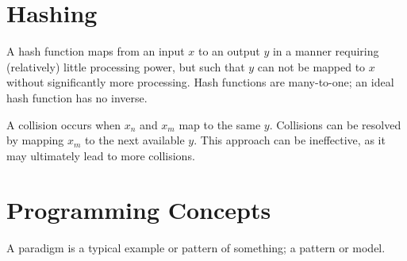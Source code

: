 \documentclass{article}
\begin{document}
\section{Hashing}

A hash function maps from an input $x$ to an output $y$ in a manner requiring
(relatively) little processing power, but such that $y$ can not be mapped to $x$
without significantly more processing. Hash functions are many-to-one; an ideal
hash function has no inverse. 

A collision occurs when $x_n$ and $x_m$ map to the same $y$. Collisions can be
resolved by mapping $x_m$ to the next available $y$. This approach can be
ineffective, as it may ultimately lead to more collisions.

\section{Programming Concepts}

A paradigm is a typical example or pattern of something; a pattern or model.
\end{document}
